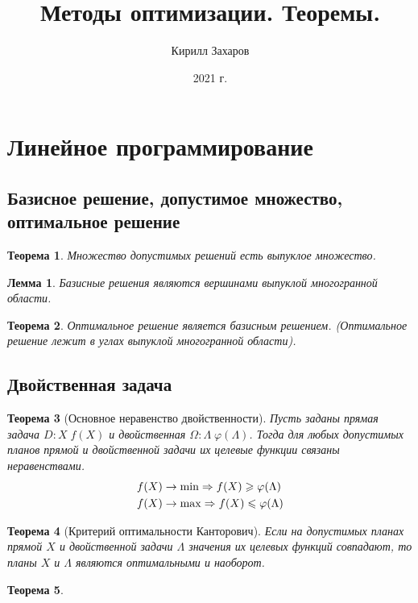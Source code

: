 \documentclass[12pt]{article}
\title{Методы оптимизации. Теоремы.}
\author{Кирилл Захаров}
\date{2021 г.}
\newtheorem{lemma}{Лемма}[section]
\newtheorem{theorem}{Теорема}[section]
\theoremstyle{definition}
\theoremstyle{remark}
\begin{document}
\maketitle
\tableofcontents

\section{Линейное программирование}
\subsection{Базисное решение, допустимое множество, оптимальное решение}

\begin{theorem}
  Множество допустимых решений есть выпуклое множество.
\end{theorem}
\begin{lemma}
  Базисные решения являются вершинами выпуклой многогранной области.
\end{lemma}
\begin{theorem}
  Оптимальное решение является базисным решением. (Оптимальное решение лежит в углах выпуклой многогранной области).
\end{theorem}
\subsection{Двойственная задача}

\begin{theorem}[Основное неравенство двойственности]
  Пусть заданы прямая задача $D: X\;f(X)$ и двойственная $\Omega :\Lambda\;\varphi(\Lambda)$. Тогда для любых допустимых планов прямой и двойственной задачи их целевые функции связаны неравенствами.
  \begin{align}
    &f(X)\to\min \Rightarrow f(X)\geqslant \varphi (\Lambda)\\
    &f(X)\to\max \Rightarrow f(X)\leqslant \varphi (\Lambda)\notag
  \end{align}
\end{theorem}
\begin{theorem}[Критерий оптимальности Канторович]
  Если на допустимых планах прямой  $X$ и двойственной задачи $\Lambda$ значения их целевых функций совпадают, то планы  $X$ и $\Lambda$ являются оптимальными и наоборот.
\end{theorem}
\begin{theorem}

\end{theorem}
\end{document}
